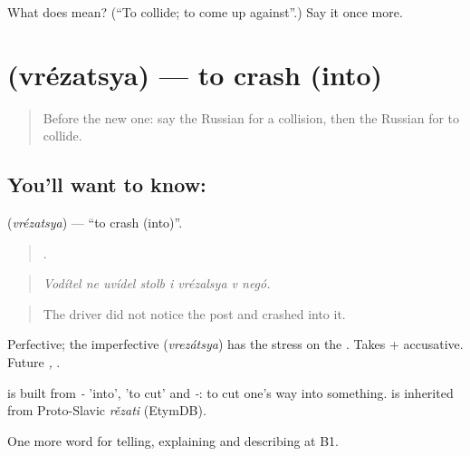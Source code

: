 \begin{tcolorbox}[breakable,colback=teal!4,colframe=teal!35!black,title={Before you move on}]
What does  mean? (\textquotedblleft{}To collide; to come up against\textquotedblright{}.) Say it once more.
\end{tcolorbox}
\section[\texorpdfstring{\ru{врезаться} (vrézatsya)}{врезаться (vrézatsya)}]{ (vrézatsya) — to crash (into)}

\label{lesson:RU-C410-vrezatsya}



\begin{quote}
Before the new one: say the Russian for a collision, then the Russian for to collide.
\end{quote}

\subsection*{You'll want to know: }
\textbf{} (\emph{vrézatsya}) — \textquotedblleft{}to crash (into)\textquotedblright{}.

\begin{quote}
       .
\end{quote}

\begin{quote}
\emph{Vodítel ne uvídel stolb i vrézalsya v negó.}
\end{quote}

\begin{quote}
The driver did not notice the post and crashed into it.
\end{quote}

Perfective; the imperfective \emph{} (\emph{vrezátsya}) has the stress on the . Takes \emph{} + accusative. Future \emph{, }.

\begin{cousinweb}
\emph{} is built from \emph{-} 'into', \emph{} 'to cut' and \emph{-}: to cut one's way into something. \emph{} is inherited from Proto-Slavic \emph{rězati} (EtymDB).
\end{cousinweb}

\begin{grammarlens}[title={What you've built}]
One more word for telling, explaining and describing at B1.
\end{grammarlens}

